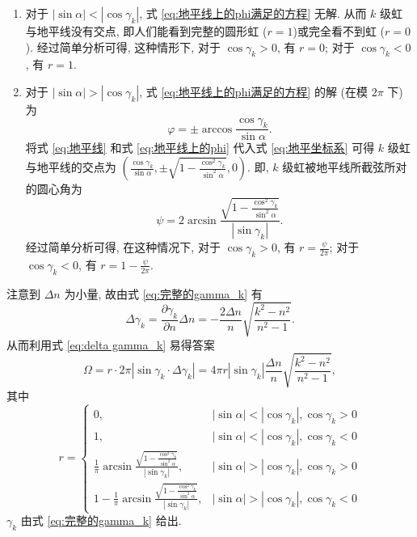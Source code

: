 \documentclass{article}
\begin{document}
\begin{enumerate}

	\item
	对于 $\left|\sin\alpha\right|<\left|\cos\gamma_k\right|$, 式 \ref{eq:地平线上的phi满足的方程} 无解.
	从而 $k$ 级虹与地平线没有交点, 即人们能看到完整的圆形虹 ($r=1$)或完全看不到虹 ($r=0$).
	经过简单分析可得, 这种情形下, 对于 $\cos\gamma_k>0$, 有 $r=0$; 对于 $\cos\gamma_k<0$, 有 $r=1$.

	\item
	对于 $\left|\sin\alpha\right|>\left|\cos\gamma_k\right|$, 式 \ref{eq:地平线上的phi满足的方程} 的解 (在模 $2\pi$ 下) 为
	\begin{equation}
		\varphi=\pm\arccos\frac{\cos\gamma_k}{\sin\alpha}.
		\label{eq:地平线上的phi}
	\end{equation}
	将式 \ref{eq:地平线} 和式 \ref{eq:地平线上的phi} 代入式 \ref{eq:地平坐标系} 可得 $k$ 级虹与地平线的交点为
	$\left(\frac{\cos\gamma_k}{\sin\alpha},\pm\sqrt{1-\frac{\cos^2\gamma_k}{\sin^2\alpha}},0\right)$.
	即, $k$ 级虹被地平线所截弦所对的圆心角为
	\begin{equation}
		\psi=2\arcsin\frac{\sqrt{1-\frac{\cos^2\gamma_k}{\sin^2\alpha}}}{\left|\sin\gamma_k\right|}.
	\end{equation}
	经过简单分析可得, 在这种情况下, 对于 $\cos\gamma_k>0$, 有 $r=\frac\psi{2\pi}$; 对于 $\cos\gamma_k<0$, 有 $r=1-\frac\psi{2\pi}$.

\end{enumerate}

注意到 $\Delta n$ 为小量, 故由式 \ref{eq:完整的gamma_k} 有
\begin{equation}
	\Delta\gamma_k=\frac{\partial\gamma_k}{\partial n}\Delta n=-\frac{2\Delta n}n\sqrt{\frac{k^2-n^2}{n^2-1}}.
	\label{eq:delta gamma_k}
\end{equation}
从而利用式 \ref{eq:delta gamma_k} 易得答案
\begin{equation}
	\Omega=r\cdot2\pi\left|\sin\gamma_k\cdot\Delta\gamma_k\right|=4\pi r\left|\sin\gamma_k\right|\frac{\Delta n}n\sqrt{\frac{k^2-n^2}{n^2-1}},
\end{equation}
其中
\begin{equation}
	r=
	\begin{cases}
		0, & \left|\sin\alpha\right|<\left|\cos\gamma_k\right|,\cos\gamma_k>0\\
		1, & \left|\sin\alpha\right|<\left|\cos\gamma_k\right|,\cos\gamma_k<0\\
		\frac1\pi\arcsin\frac{\sqrt{1-\frac{\cos^2\gamma_k}{\sin^2\alpha}}}{\left|\sin\gamma_k\right|}, & \left|\sin\alpha\right|>\left|\cos\gamma_k\right|,\cos\gamma_k>0\\
		1-\frac1\pi\arcsin\frac{\sqrt{1-\frac{\cos^2\gamma_k}{\sin^2\alpha}}}{\left|\sin\gamma_k\right|}, & \left|\sin\alpha\right|>\left|\cos\gamma_k\right|,\cos\gamma_k<0
	\end{cases}
\end{equation}
$\gamma_k$ 由式 \ref{eq:完整的gamma_k} 给出.
\end{document}

